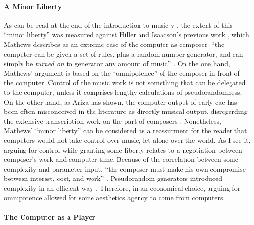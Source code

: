 \paragraph{A Minor Liberty}
As can be read at the end of the introduction to \gls{music-v} \parencite{Mat63:The}, the extent of this ``minor liberty'' was measured against Hiller and Isaacson's previous work \parencite{Hil59:Exp}, which Mathews describes as an extreme case of the computer as composer: ``the computer can be given a set of rules, plus a random-number generator, and can simply be \textit{turned on} to generator any amount of music'' \parencite[557]{Mat63:The}. On the one hand, Mathews' argument is based on the ``omnipotence'' of the composer in front of the computer. Control of the music work is not something that can be delegated to the computer, unless it comprises lengthy calculations of pseudorandomness. On the other hand, as Ariza has shown, the computer output of early \gls{cac} has been often misconceived in the literature as directly musical output, disregarding the extensive transcription work on the part of composers \parencite{Ari05:Ano}. Nonetheless, Mathews' ``minor liberty'' can be considered as a reassurment for the reader that computers would not take control over music, let alone over the world. As I see it, arguing for control while granting some liberty relates to a negotiation between composer's work and computer time. Because of the correlation between sonic complexity and parameter input, ``the composer must make his own compromise between interest, cost, and work'' \parencite[555]{Mat63:The}. Pseudorandom generators introduced complexity in an efficient way \parencite{fdch/papers/spectral}. Therefore, in an economical choice, arguing for omnipotence allowed for some aesthetics agency to come from computers. 

\paragraph{The Computer as a Player}

